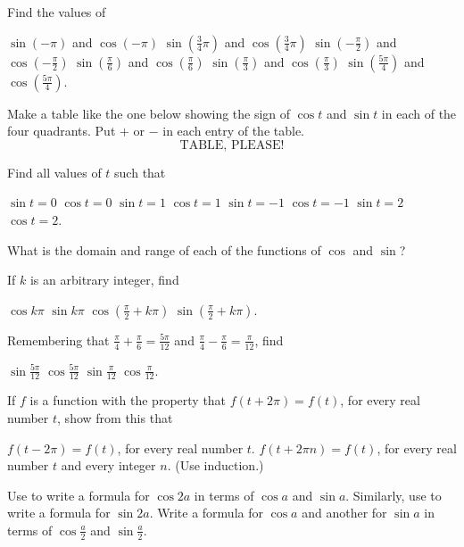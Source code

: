 \begin{exercises}

Find the values of
\begin{exenum}
\x
$\sin(-\pi)$ and $\cos(-\pi)$
\x
$\sin(\frac34\pi)$ and $\cos(\frac34\pi)$
\x
$\sin(-\frac{\pi}2)$ and $\cos(-\frac{\pi}2)$
\x
$\sin(\frac{\pi}6)$ and $\cos(\frac{\pi}6)$
\x
$\sin(\frac{\pi}3)$ and $\cos(\frac{\pi}3)$
\x
$\sin(\frac{5\pi}4)$ and $\cos(\frac{5\pi}4)$.
\end{exenum}

Make a table like the one below showing the sign
of $\cos t$ and $\sin t$ in each of the four quadrants.
Put $+$ or $-$ in each entry of the table.
\[
\mbox{TABLE, PLEASE!}
\]

Find all values of $t$ such that
\begin{exenum}
\x
$\sin t = 0$
\x
$\cos t = 0$
\x
$\sin t = 1$
\x
$\cos t = 1$
\x
$\sin t = -1$
\x
$\cos t = -1$
\x
$\sin t = 2$
\x
$\cos t = 2$.
\end{exenum}

What is the domain and range of each of the
functions of $\cos$ and $\sin$?

If $k$ is an arbitrary integer, find
\begin{exenum}
\x
$\cos k\pi$
\x
$\sin k\pi$
\x
$\cos \left( \frac{\pi}2 + k\pi \right)$
\x
$\sin \left( \frac{\pi}2 + k\pi \right)$.
\end{exenum}

Remembering that
$\frac{\pi}4 + \frac{\pi}6 = \frac{5\pi}{12}$ and
$\frac{\pi}4 - \frac{\pi}6 = \frac{\pi}{12}$, find
\begin{exenum}
\x
$\sin \frac{5\pi}{12}$
\x
$\cos \frac{5\pi}{12}$
\x
$\sin \frac{\pi}{12}$
\x
$\cos \frac{\pi}{12}$.
\end{exenum}

If $f$ is a function with the property that
$f(t+2\pi) = f(t)$, for every real number
$t$, show from this that
\begin{exenum}
\x
$f(t-2\pi) = f(t)$, for every real number $t$.
\x
$f(t+2\pi n) = f(t)$, for every real number $t$
and every integer $n$.
(Use induction.)
\end{exenum}

\begin{exenum}
\x
{}
Use  to write a formula for
$\cos 2a$ in terms of $\cos a$ and $\sin a$.
\x
Similarly, use  to write a formula
for $\sin 2a$.
\x
Write a formula for $\cos a$ and another
for $\sin a$ in terms of
$\cos \frac a2$ and $\sin \frac a2$.
\end{exenum}


\end{exercises}
